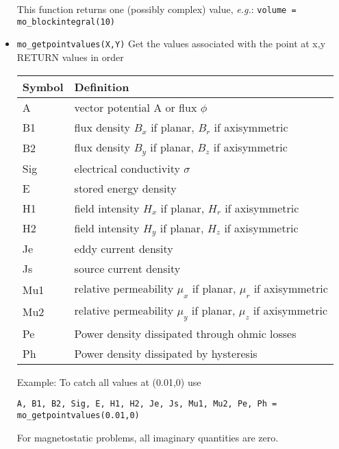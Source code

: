 \begin{itemize}
\begin{center}
\begin{tabular}{ll}
 \hline

 \end{tabular}
 \end{center}
This function returns one (possibly complex) value, {\em
e.g.}: {\tt volume = mo\_blockintegral(10)}


\item{\tt mo\_getpointvalues(X,Y)}
Get the values associated with the point at x,y RETURN values in
order
\begin{center}
\begin{tabular}{ll} \hline
Symbol & Definition \\ \hline
 A & vector potential A or flux $\phi$ \\
 B1 & flux density $B_x$ if planar, $B_r$ if axisymmetric \\
 B2 & flux density $B_y$ if planar, $B_z$ if axisymmetric \\
 Sig & electrical conductivity $\sigma$ \\
 E & stored energy density\\
 H1 & field intensity $H_x$ if planar, $H_r$ if axisymmetric \\
 H2 & field intensity $H_y$ if planar, $H_z$ if axisymmetric \\
 Je & eddy current density \\
 Js & source current density\\
 Mu1 & relative permeability $\mu_x$ if planar, $\mu_r$ if axisymmetric \\
 Mu2 & relative permeability $\mu_y$ if planar, $\mu_z$ if axisymmetric \\
 Pe & Power density dissipated through ohmic losses \\
 Ph & Power density dissipated by hysteresis \\ \hline
 \end{tabular}
\end{center}

Example: To catch all values at (0.01,0) use

{\tt A, B1, B2, Sig, E, H1, H2, Je, Js, Mu1, Mu2, Pe, Ph = mo\_getpointvalues(0.01,0)}

For magnetostatic problems, all imaginary quantities are zero.


\end{itemize}
